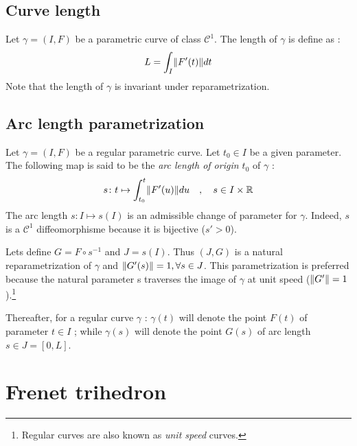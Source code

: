 \subsection{Curve length}
Let $\gamma=(I,F)$ be a parametric curve of class ${\mathcal{C}}^{1}$. The length of $\gamma$ is define as :
\begin{equation}
	L=\int_{I}\lVert F'(t)\rVert dt
\end{equation}
Note that the length of $\gamma$ is invariant under reparametrization.

\subsection{Arc length parametrization}
Let $\gamma=(I,F)$ be a regular parametric curve. Let $t_0 \in I$ be a given parameter. The following map is said to be the \emph{arc length of origin $t_0$} of $\gamma$ :
\begin{equation}
	s \colon t \mapsto \int_{t_{0}}^{t}\lVert F'(u)\rVert du
	\quad,\quad
	s \in I \times \mathbb{R}
\end{equation}
The arc length $s \colon I\mapsto s(I)$ is an admissible change of parameter for $\gamma$. Indeed, $s$ is a ${\mathcal{C}}^{1}$ diffeomorphisme because it is bijective ($s'>0$).

Lets define $G=F\circ s^{-1}$ and $J=s(I)$. Thus $(J,G)$ is a natural reparametrization of $\gamma$ and  $\lVert G'(s)\rVert = 1, \forall s \in J$. This parametrization is preferred because the natural parameter s traverses the image of $\gamma$ at unit speed ($\lVert G'\rVert = 1$).\footnote{Regular curves are also known as \emph{unit speed} curves.}

Thereafter, for a regular curve $\gamma$ : $\gamma(t)$ will denote the point $F(t)$ of parameter $t \in I$ ; while $\gamma(s)$ will denote the point $G(s)$ of arc length $s \in J=[0,L]$.


\section{Frenet trihedron}\label{sec:frenettrihedron}


